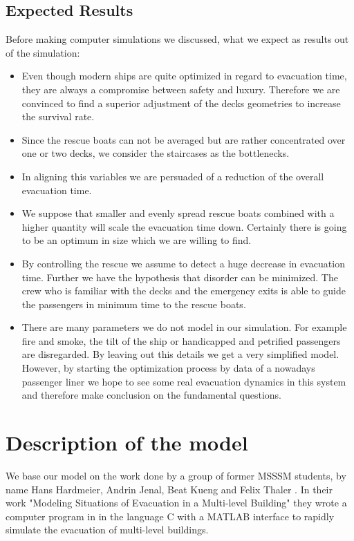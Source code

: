 \documentclass[11pt]{article}
\begin{document}
\subsection{Expected Results}
Before making computer simulations we discussed, what we expect as results out of the simulation:
\begin{itemize}
\item Even though modern ships are quite optimized in regard to evacuation time, they are always a compromise between safety and luxury. Therefore we are convinced to find a superior adjustment of the decks geometries to increase the survival rate.
\item Since the rescue boats can not be averaged but are rather concentrated over one or two decks, we consider the staircases as the bottlenecks.
\item In aligning this variables we are persuaded of a reduction of the overall evacuation time.
\item We suppose that smaller and evenly spread rescue boats combined with a higher quantity will scale the evacuation time down. Certainly there is going to be an optimum in size which we are willing to find.
\item By controlling the rescue we assume to detect a huge decrease in evacuation time. Further we have the hypothesis that disorder can be minimized. The crew who is familiar with the decks and the emergency exits is able to guide the passengers in minimum time to the rescue boats.
\item There are many parameters we do not model in our simulation. For example fire and smoke, the tilt of the ship or handicapped and petrified passengers are disregarded. By leaving out this details we get a very simplified model. However, by starting the optimization process by data of a nowadays passenger liner we hope to see some real evacuation dynamics in this system and therefore make conclusion on the fundamental questions.
\end{itemize}

\newpage

\section{Description of the model}
We base our model on the work done by a group of former MSSSM students, by name Hans Hardmeier, Andrin Jenal, Beat Kueng and Felix Thaler \cite{Building}. In their work "Modeling Situations of Evacuation in a Multi-level Building" they wrote a computer program in in the language C with a MATLAB interface to rapidly simulate the evacuation of multi-level buildings.\bigskip
\end{document}
